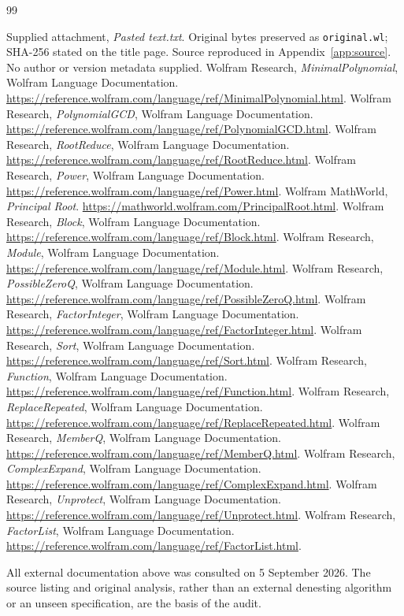 \documentclass[11pt,letterpaper]{article}
\theoremstyle{definition}
\begin{document}
\begin{thebibliography}{99}
 Supplied attachment, \emph{Pasted text.txt}. Original bytes preserved
as \texttt{original.wl}; SHA-256 stated on the title page. Source reproduced in
Appendix~\ref{app:source}. No author or version metadata supplied.
 Wolfram Research, \emph{MinimalPolynomial}, Wolfram Language
Documentation. \url{https://reference.wolfram.com/language/ref/MinimalPolynomial.html}.
 Wolfram Research, \emph{PolynomialGCD}, Wolfram Language
Documentation. \url{https://reference.wolfram.com/language/ref/PolynomialGCD.html}.
 Wolfram Research, \emph{RootReduce}, Wolfram Language
Documentation. \url{https://reference.wolfram.com/language/ref/RootReduce.html}.
 Wolfram Research, \emph{Power}, Wolfram Language Documentation.
\url{https://reference.wolfram.com/language/ref/Power.html}.
 Wolfram MathWorld, \emph{Principal Root}.
\url{https://mathworld.wolfram.com/PrincipalRoot.html}.
 Wolfram Research, \emph{Block}, Wolfram Language Documentation.
\url{https://reference.wolfram.com/language/ref/Block.html}.
 Wolfram Research, \emph{Module}, Wolfram Language Documentation.
\url{https://reference.wolfram.com/language/ref/Module.html}.
 Wolfram Research, \emph{PossibleZeroQ}, Wolfram Language
Documentation. \url{https://reference.wolfram.com/language/ref/PossibleZeroQ.html}.
 Wolfram Research, \emph{FactorInteger}, Wolfram Language
Documentation. \url{https://reference.wolfram.com/language/ref/FactorInteger.html}.
 Wolfram Research, \emph{Sort}, Wolfram Language Documentation.
\url{https://reference.wolfram.com/language/ref/Sort.html}.
 Wolfram Research, \emph{Function}, Wolfram Language Documentation.
\url{https://reference.wolfram.com/language/ref/Function.html}.
 Wolfram Research, \emph{ReplaceRepeated}, Wolfram Language
Documentation. \url{https://reference.wolfram.com/language/ref/ReplaceRepeated.html}.
 Wolfram Research, \emph{MemberQ}, Wolfram Language Documentation.
\url{https://reference.wolfram.com/language/ref/MemberQ.html}.
 Wolfram Research, \emph{ComplexExpand}, Wolfram Language
Documentation. \url{https://reference.wolfram.com/language/ref/ComplexExpand.html}.
 Wolfram Research, \emph{Unprotect}, Wolfram Language Documentation.
\url{https://reference.wolfram.com/language/ref/Unprotect.html}.
 Wolfram Research, \emph{FactorList}, Wolfram Language
Documentation. \url{https://reference.wolfram.com/language/ref/FactorList.html}.
\end{thebibliography}
All external documentation above was consulted on 5 September 2026. The source
listing and original analysis, rather than an external denesting algorithm or an
unseen specification, are the basis of the audit.
\end{document}
